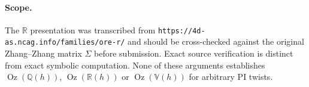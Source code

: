 \documentclass[11pt]{amsart}
\DeclareMathOperator{\Oz}{Oz}
\begin{document}
\paragraph{Scope.} The $\mathbb R$ presentation was transcribed from
\texttt{https://4d-as.ncag.info/families/ore-r/} and should be
cross-checked against the original Zhang--Zhang matrix $\Sigma$ before
submission. Exact source verification is distinct from exact symbolic
computation. None of these arguments establishes $\Oz(\mathbb Q(h))$,
$\Oz(\mathbb R(h))$ or $\Oz(\mathbb V(h))$ for arbitrary PI twists.
\end{document}
